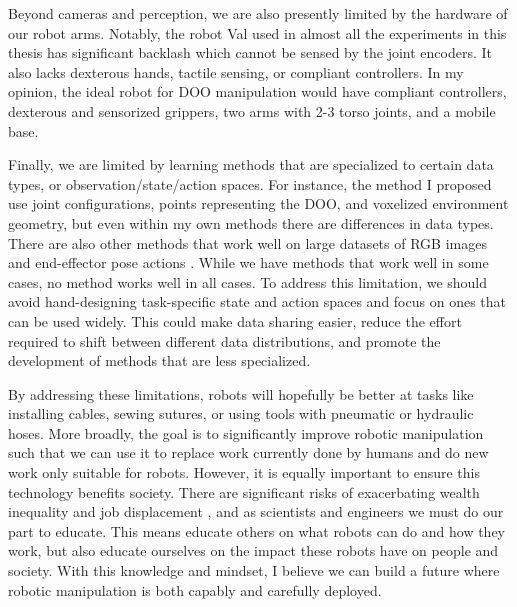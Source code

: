 Beyond cameras and perception, we are also presently limited by the hardware of our robot arms. Notably, the robot Val used in almost all the experiments in this thesis has significant backlash which cannot be sensed by the joint encoders. It also lacks dexterous hands, tactile sensing, or compliant controllers. In my opinion, the ideal robot for DOO manipulation would have compliant controllers, dexterous and sensorized grippers, two arms with 2-3 torso joints, and a mobile base.

Finally, we are limited by learning methods that are specialized to certain data types, or observation/state/action spaces. For instance, the method I proposed use joint configurations, points representing the DOO, and voxelized environment geometry, but even within my own methods there are differences in data types. There are also other methods that work well on large datasets of RGB images and end-effector pose actions \cite{RT2}. While we have methods that work well in some cases, no method works well in all cases. To address this limitation, we should avoid hand-designing task-specific state and action spaces and focus on ones that can be used widely. This could make data sharing easier, reduce the effort required to shift between different data distributions, and promote the development of methods that are less specialized.

By addressing these limitations, robots will hopefully be better at tasks like installing cables, sewing sutures, or using tools with pneumatic or hydraulic hoses. More broadly, the goal is to significantly improve robotic manipulation such that we can use it to replace work currently done by humans and do new work only suitable for robots. However, it is equally important to ensure this technology benefits society. There are significant risks of exacerbating wealth inequality and job displacement \cite{AutomationInequality, WEF2023}, and as scientists and engineers we must do our part to educate. This means educate others on what robots can do and how they work, but also educate ourselves on the impact these robots have on people and society. With this knowledge and mindset, I believe we can build a future where robotic manipulation is both capably and carefully deployed.

